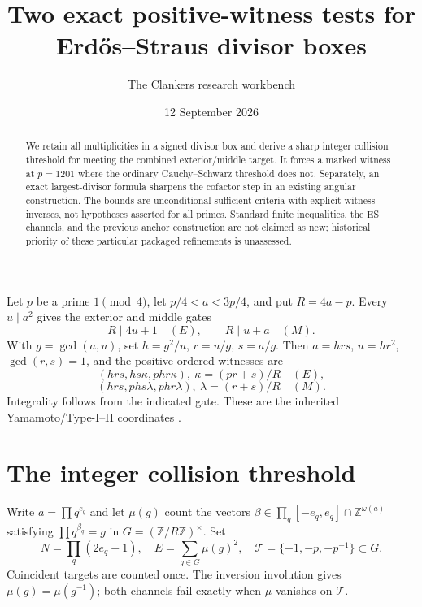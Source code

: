 \documentclass[11pt]{amsart}
\title{Two exact positive-witness tests for Erd\H{o}s--Straus divisor boxes}
\author{The Clankers research workbench}\date{12 September 2026}
\newcommand{\Z}{\mathbb Z}\newcommand{\Q}{\mathbb Q}
\begin{document}
\begin{abstract}
We retain all multiplicities in a signed divisor box and derive a sharp
integer collision threshold for meeting the combined exterior/middle target.
It forces a marked witness at $p=1201$ where the ordinary Cauchy--Schwarz
threshold does not. Separately, an exact largest-divisor formula sharpens the
cofactor step in an existing angular construction. The bounds are unconditional
sufficient criteria with explicit witness inverses, not hypotheses asserted
for all primes. Standard finite inequalities, the ES channels, and the
previous anchor construction are not claimed as new; historical priority of
these particular packaged refinements is unassessed.
\end{abstract}
\maketitle

Let $p$ be a prime $1\pmod4$, let $p/4<a<3p/4$, and put $R=4a-p$.
Every $u\mid a^2$ gives the exterior and middle gates
\[
 R\mid4u+1\quad(E),\qquad R\mid u+a\quad(M).
\]
With $g=\gcd(a,u)$, set $h=g^2/u$, $r=u/g$, $s=a/g$.
Then $a=hrs$, $u=hr^2$, $\gcd(r,s)=1$, and the positive ordered witnesses are
\[
 (hrs,hs\kappa,phr\kappa),\ \kappa=(pr+s)/R\quad(E),
\]
\[
 (hrs,phs\lambda,phr\lambda),\ \lambda=(r+s)/R\quad(M).
\]
Integrality follows from the indicated gate. These are the inherited
Yamamoto/Type-I--II coordinates \cite{y,et}.

\section{The integer collision threshold}
Write $a=\prod q^{e_q}$ and let $\mu(g)$ count the vectors
$\beta\in\prod_q[-e_q,e_q]\cap\Z^{\omega(a)}$ satisfying
$\prod q^{\beta_q}=g$ in $G=(\Z/R\Z)^\times$. Set
\[
 N=\prod_q(2e_q+1),\quad E=\sum_{g\in G}\mu(g)^2,
 \quad\mathcal T=\{-1,-p,-p^{-1}\}\subset G.
\]
Coincident targets are counted once. The inversion involution gives
$\mu(g)=\mu(g^{-1})$; both channels fail exactly when
$\mu$ vanishes on $\mathcal T$.
\end{document}
